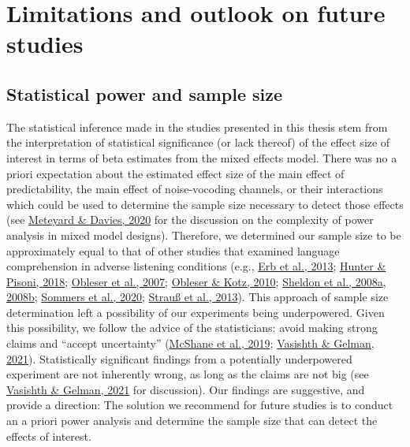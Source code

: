\documentclass[a4paper, nobind]{templates/ociamthesis}
\begin{document}
\hypertarget{limitations-and-outlook-on-future-studies}{%
\section{Limitations and outlook on future studies}\label{limitations-and-outlook-on-future-studies}}

\hypertarget{statistical-power-and-sample-size}{%
\subsection{Statistical power and sample size}\label{statistical-power-and-sample-size}}

The statistical inference made in the studies presented in this thesis stem from the interpretation of statistical significance (or lack thereof) of the effect size of interest in terms of beta estimates from the mixed effects model.
There was no a priori expectation about the estimated effect size of the main effect of predictability, the main effect of noise-vocoding channels, or their interactions which could be used to determine the sample size necessary to detect those effects
(see \protect\hyperlink{ref-Meteyard2020}{Meteyard \& Davies, 2020} for the discussion on the complexity of power analysis in mixed model designs).
Therefore, we determined our sample size to be approximately equal to that of other studies that examined language comprehension in adverse listening conditions (e.g., \protect\hyperlink{ref-Erb2013}{Erb et al., 2013}; \protect\hyperlink{ref-Hunter2018}{Hunter \& Pisoni, 2018}; \protect\hyperlink{ref-Obleser2007}{Obleser et al., 2007}; \protect\hyperlink{ref-Obleser2010}{Obleser \& Kotz, 2010}; \protect\hyperlink{ref-Sheldon2008a}{Sheldon et al., 2008a}, \protect\hyperlink{ref-Sheldon2008b}{2008b}; \protect\hyperlink{ref-Sommers2020}{Sommers et al., 2020}; \protect\hyperlink{ref-Strauss2013}{Strauß et al., 2013}).
This approach of sample size determination left a possibility of our experiments being underpowered.
Given this possibility, we follow the advice of the statisticians:
avoid making strong claims and ``accept uncertainty'' (\protect\hyperlink{ref-McShane2019}{McShane et al., 2019}; \protect\hyperlink{ref-Vasishth2021}{Vasishth \& Gelman, 2021}).
Statistically significant findings from a potentially underpowered experiment are not inherently wrong, as long as the claims are not big (see \protect\hyperlink{ref-Vasishth2021}{Vasishth \& Gelman, 2021} for discussion).
Our findings are suggestive, and provide a direction:
The solution we recommend for future studies is to conduct an a priori power analysis and determine the sample size that can detect the effects of interest.
\end{document}
